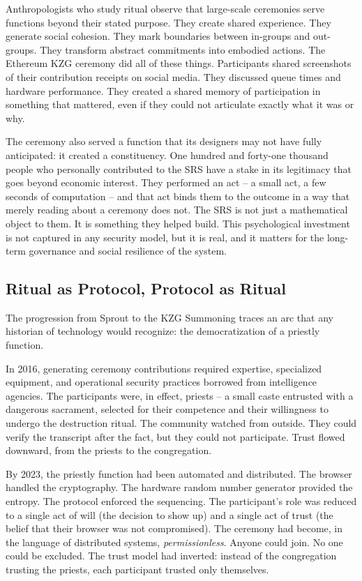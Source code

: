 \documentclass[
  11pt,
  openany]{report}
\begin{document}
Anthropologists who study ritual observe that large-scale ceremonies serve
functions beyond their stated purpose. They create shared experience. They
generate social cohesion. They mark boundaries between in-groups and out-groups.
They transform abstract commitments into embodied actions. The Ethereum KZG
ceremony did all of these things. Participants shared screenshots of their
contribution receipts on social media. They discussed queue times and hardware
performance. They created a shared memory of participation in something that
mattered, even if they could not articulate exactly what it was or why.

The ceremony also served a function that its designers may not have fully
anticipated: it created a constituency. One hundred and forty-one thousand
people who personally contributed to the SRS have a stake in its legitimacy that
goes beyond economic interest. They performed an act -- a small act, a few
seconds of computation -- and that act binds them to the outcome in a way that
merely reading about a ceremony does not. The SRS is not just a mathematical
object to them. It is something they helped build. This psychological investment
is not captured in any security model, but it is real, and it matters for the
long-term governance and social resilience of the system.

\subsection{Ritual as Protocol, Protocol as
Ritual}\label{ritual-as-protocol-protocol-as-ritual}

The progression from Sprout to the KZG Summoning traces an arc that any
historian of technology would recognize: the democratization of a priestly
function.

In 2016, generating ceremony contributions required expertise, specialized
equipment, and operational security practices borrowed from intelligence
agencies. The participants were, in effect, priests -- a small caste entrusted
with a dangerous sacrament, selected for their competence and their willingness
to undergo the destruction ritual. The community watched from outside. They
could verify the transcript after the fact, but they could not participate.
Trust flowed downward, from the priests to the congregation.

By 2023, the priestly function had been automated and distributed. The browser
handled the cryptography. The hardware random number generator provided the
entropy. The protocol enforced the sequencing. The participant's role was
reduced to a single act of will (the decision to show up) and a single act of
trust (the belief that their browser was not compromised). The ceremony had
become, in the language of distributed systems, \emph{permissionless}. Anyone
could join. No one could be excluded. The trust model had inverted: instead of
the congregation trusting the priests, each participant trusted only themselves.
\end{document}
